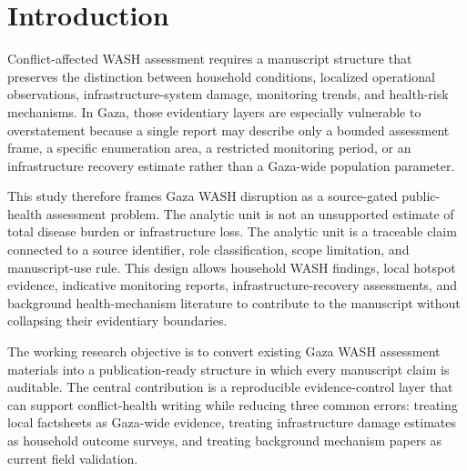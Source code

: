 
\section{Introduction}

Conflict-affected WASH assessment requires a manuscript structure that preserves the distinction between household conditions, localized operational observations, infrastructure-system damage, monitoring trends, and health-risk mechanisms. In Gaza, those evidentiary layers are especially vulnerable to overstatement because a single report may describe only a bounded assessment frame, a specific enumeration area, a restricted monitoring period, or an infrastructure recovery estimate rather than a Gaza-wide population parameter.

This study therefore frames Gaza WASH disruption as a source-gated public-health assessment problem. The analytic unit is not an unsupported estimate of total disease burden or infrastructure loss. The analytic unit is a traceable claim connected to a source identifier, role classification, scope limitation, and manuscript-use rule. This design allows household WASH findings, local hotspot evidence, indicative monitoring reports, infrastructure-recovery assessments, and background health-mechanism literature to contribute to the manuscript without collapsing their evidentiary boundaries.

The working research objective is to convert existing Gaza WASH assessment materials into a publication-ready structure in which every manuscript claim is auditable. The central contribution is a reproducible evidence-control layer that can support conflict-health writing while reducing three common errors: treating local factsheets as Gaza-wide evidence, treating infrastructure damage estimates as household outcome surveys, and treating background mechanism papers as current field validation.

